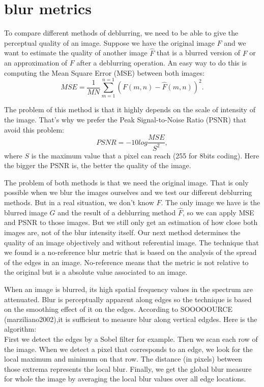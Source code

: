 \section{blur metrics}

To compare different methods of deblurring, we need to be able to give the perceptual quality of an image. Suppose we have the original image $F$ and we want to estimate the quality of another image $\hat{F}$ that is a blurred version of $F$ or an approximation of $F$ after a deblurring operation. An easy way to do this is computing the Mean Square Error (MSE) between both images:
\begin{equation}
MSE=\frac{1}{MN} \sum\limits_{m=1}^{n=1}\left(F(m,n)-\hat{F}(m,n)\right)^2.
\end{equation}

The problem of this method is that it highly depends on the scale of intensity of the image. That's why we prefer the Peak Signal-to-Noise Ratio (PSNR) that avoid this problem:
\begin{equation}
PSNR = -10 log \frac{MSE}{S^2},
\end{equation}
where $S$ is the maximum value that a pixel can reach (255 for 8bits coding). Here the bigger the PSNR is, the better the quality of the image.

The problem of both methods is that we need the original image. That is only possible when we blur the images ourselves and we test our different deblurring methods. But in a real situation, we don't know $F$. The only image we have is the blurred image $G$ and the result of a deblurring method $\hat{F}$, so we can apply MSE and PSNR to those images. But we still only get an estimation of how close both images are, not of the blur intensity itself. Our next method determines the quality of an image objectively and without referential image. The technique that we found is a no-reference blur metric that is based on the analysis of the spread of the edges in an image. No-reference means that the metric is not relative to the original but is a absolute value associated to an image.

When an image is blurred, its high spatial frequency values in the spectrum are attenuated. Blur is perceptually apparent along edges so the technique is based on the smoothing effect of it on the edges. According to SOOOOOURCE (marziliano2002),it is sufficient to measure blur along vertical edgdes. Here is the algorithm:\\
First we detect the edges by a Sobel filter for example. Then we scan each row of the image. When we detect a pixel that corresponds to an edge, we look for the local maximum and minimum on that row. The distance (in pixels) between those extrema represents the local blur. Finally, we get the global blur measure for whole the image by averaging the local blur values over all edge locations.

